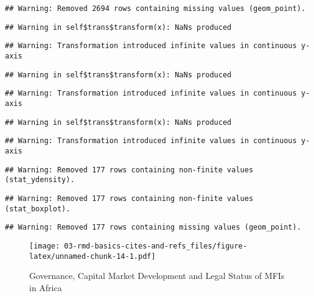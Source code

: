 \documentclass[a4paper,nobind]{templates/ociamthesis}
\begin{document}
\begin{landscape}
\begin{verbatim}
## Warning: Removed 2694 rows containing missing values (geom_point).
\end{verbatim}

\begin{verbatim}
## Warning in self$trans$transform(x): NaNs produced
\end{verbatim}

\begin{verbatim}
## Warning: Transformation introduced infinite values in continuous y-axis
\end{verbatim}

\begin{verbatim}
## Warning in self$trans$transform(x): NaNs produced
\end{verbatim}

\begin{verbatim}
## Warning: Transformation introduced infinite values in continuous y-axis
\end{verbatim}

\begin{verbatim}
## Warning in self$trans$transform(x): NaNs produced
\end{verbatim}

\begin{verbatim}
## Warning: Transformation introduced infinite values in continuous y-axis
\end{verbatim}

\begin{verbatim}
## Warning: Removed 177 rows containing non-finite values (stat_ydensity).
\end{verbatim}

\begin{verbatim}
## Warning: Removed 177 rows containing non-finite values (stat_boxplot).
\end{verbatim}

\begin{verbatim}
## Warning: Removed 177 rows containing missing values (geom_point).
\end{verbatim}

\begin{figure}
\centering
\texttt{[image: 03-rmd-basics-cites-and-refs\_files/figure-latex/unnamed-chunk-14-1.pdf]}
\caption{\label{fig:unnamed-chunk-14}Governance, Capital Market Development and Legal Status of MFIs in Africa}
\end{figure}

\end{landscape}
\end{document}
